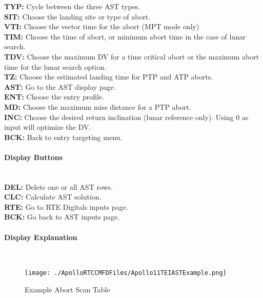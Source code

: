 \documentclass[11pt]{article} %
\begin{document}
\textbf{TYP:} Cycle between the three AST types.\\
\textbf{SIT:} Choose the landing site or type of abort.\\
\textbf{VTI:} Choose the vector time for the abort (MPT mode only)\\
\textbf{TIM:} Choose the time of abort, or minimum abort time in the case of lunar search.\\
\textbf{TDV:} Choose the maximum DV for a time critical abort or the maximum abort time for the lunar search option.\\
\textbf{TZ:} Choose the estimated landing time for PTP and ATP aborts.\\
\textbf{AST:} Go to the AST display page.\\
\textbf{ENT:} Choose the entry profile.\\
\textbf{MD:} Choose the maximum miss distance for a PTP abort.\\
\textbf{INC:} Choose the desired return inclination (lunar reference only). Using 0 as input will optimize the DV.\\
\textbf{BCK:} Back to entry targeting menu.\\

\paragraph{Display Buttons}\mbox{} \\
\textbf{DEL:} Delete one or all AST rows.\\
\textbf{CLC:} Calculate AST solution.\\
\textbf{RTE:} Go to RTE Digitals inputs page.\\
\textbf{BCK:} Go back to AST inputs page.\\

\paragraph{Display Explanation}\mbox{} \\

\begin{figure}[hp]
	\centering
		\texttt{[image: ./ApolloRTCCMFDFiles/Apollo11TEIASTExample.png]}
	\caption{Example Abort Scan Table}
	\label{fig:Apollo11TEIASTExample}
\end{figure}
\end{document}
